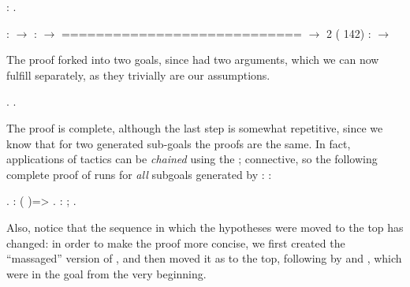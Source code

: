 \begin{coqdoccode}
\coqdocemptyline
\coqdocnoindent
{}: .\coqdoceol
\end{coqdoccode}


\coqdoceol
\coqdocemptyline
\coqdocindent{1.00em}
 :  \ensuremath{\rightarrow} \coqdoceol
\coqdocindent{1.00em}
 :  \ensuremath{\rightarrow} \coqdoceol
\coqdocindent{1.00em}
============================\coqdoceol
\coqdocindent{1.50em}
 \ensuremath{\rightarrow} \coqdoceol
\coqdocnoindent
\coqdoceol
\coqdocnoindent
{} 2 ( 142) :\coqdoceol
\coqdocindent{0.50em}
 \ensuremath{\rightarrow} 

\coqdocemptyline


The proof forked into two goals, since  had two arguments, which we
can now fulfill separately, as they trivially are our assumptions.  


\begin{coqdoccode}
\coqdocemptyline
\coqdocnoindent
{}.\coqdoceol
\coqdocnoindent
{}.\coqdoceol
\coqdocemptyline
\end{coqdoccode}


The proof is complete, although the last step is somewhat repetitive,
since we know that for two generated sub-goals the proofs are the
same. In fact, applications of tactics can be \textit{chained} using the ;
\ssrtl{;}connective, so the following complete proof of 
runs  for \textit{all} subgoals generated by :
:


\begin{coqdoccode}
\coqdocemptyline
\coqdocnoindent
{}.\coqdoceol
\coqdocemptyline
\coqdocnoindent
{}: (   )=>   .\coqdoceol
\coqdocnoindent
{}: ; .\coqdoceol
\coqdocemptyline
\end{coqdoccode}


Also, notice that the sequence in which the hypotheses were moved to
the top has changed: in order to make the proof more concise, we first
created the ``massaged'' version of , and then moved it as
 to the top, following by  and , which were in the goal
from the very beginning.


